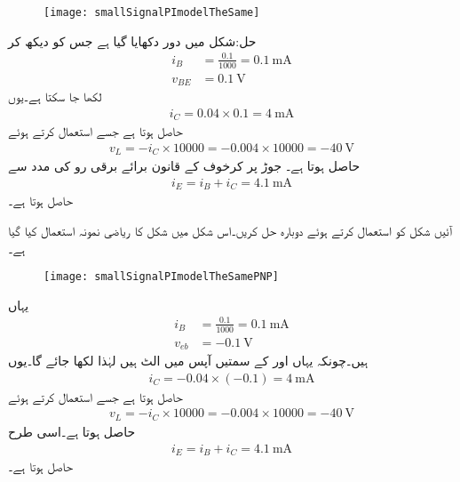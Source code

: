\begin{figure}
\centering
\texttt{[image: smallSignalPImodelTheSame]}
\caption{}
\label{شکل_باریک_اشاراتی_پائے_ماڈل_یکساں}
\end{figure}
حل:شکل  میں دور دکھایا گیا ہے جس کو دیکھ کر
\begin{align*}
i_B&=\frac{0.1}{1000}=\SI{0.1}{\milli \ampere}\\
v_{BE}&=\SI{0.1}{\volt}
\end{align*}
لکھا جا سکتا ہے۔یوں 
\begin{align*}
i_C=0.04 \times 0.1=\SI{4}{\milli \ampere}
\end{align*}
حاصل ہوتا ہے جسے استعمال کرتے ہوئے
\begin{align*}
v_L=-i_C \times 10000=-0.004 \times 10000=\SI{-40}{\volt}
\end{align*}
حاصل ہوتا ہے۔ جوڑ پر کرخوف کے قانون برائے برقی رو کی مدد سے 
\begin{align*}
i_E=i_B+i_C=\SI{4.1}{\milli \ampere}
\end{align*}
حاصل ہوتا ہے۔

آئیں شکل  کو استعمال کرتے ہوئے دوبارہ حل کریں۔اس شکل میں شکل  کا ریاضی نمونہ  استعمال کیا گیا ہے۔
\begin{figure}
\centering
\texttt{[image: smallSignalPImodelTheSamePNP]}
\caption{}
\label{شکل_باریک_اشاراتی_پائے_ماڈل_یکساں_الف}
\end{figure}
یہاں
\begin{align*}
i_B&=\frac{0.1}{1000}=\SI{0.1}{\milli \ampere}\\
v_{eb}&=\SI{-0.1}{\volt}
\end{align*}
ہیں۔چونکہ یہاں  اور  کے سمتیں آپس میں الٹ ہیں لہٰذا  لکھا جائے گا۔یوں
\begin{align*}
i_C=-0.04 \times \left(-0.1 \right)=\SI{4}{\milli \ampere}
\end{align*}
حاصل ہوتا ہے جسے استعمال کرتے ہوئے
\begin{align*}
v_L=-i_C \times 10000=-0.004 \times 10000=\SI{-40}{\volt}
\end{align*}
حاصل ہوتا ہے۔اسی طرح
\begin{align*}
i_E=i_B+i_C=\SI{4.1}{\milli \ampere}
\end{align*}
حاصل ہوتا ہے۔

